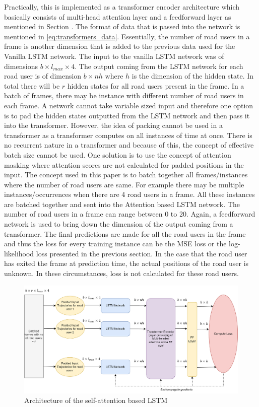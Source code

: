 \documentclass{article}
\begin{document}
Practically, this is implemented as a transformer encoder architecture which basically consists of multi-head attention layer and a feedforward layer as mentioned in Section .
The format of data that is passed into the network is mentioned in \ref{eq:transformers_data}. Essentially, the number of road users in a frame is another dimension that is added to the previous data used for the Vanilla LSTM network. The input to the vanilla LSTM network was of dimensions $b \times l_{max} \times 4$. The output coming from the LSTM network for each road user is of dimension $b \times nh$ where $h$ is the dimension of the hidden state. In total there will be $r$ hidden states for all road users present in the frame. In a batch of frames, there may be instance with different number of road users in each frame. A network cannot take variable sized input and therefore one option is to pad the hidden states outputted from the LSTM network and then pass it into the transformer. However, the idea of packing cannot be used in a transformer as a transformer computes on all instances of time at once. There is no recurrent nature in a transformer and because of this, the concept of effective batch size cannot be used. One solution is to use the concept of attention masking where attention scores are not calculated for padded positions in the input. The concept used in this paper is to batch together all frames/instances where the number of road users are same. For example there may be multiple instances/occurrences when there are 4 road users in a frame. All these instances are batched together and sent into the Attention based LSTM network. The number of road users in a frame can range between 0 to 20. Again, a feedforward network is used to bring down the dimension of the output coming from a transformer. The final predictions are made for all the road users in the frame and thus the loss for every training instance can be the MSE loss or the log-likelihood loss presented in the previous section. In the case that the road user has exited the frame at prediction time, the actual positions of the road user is unknown. In these  circumstances, loss is not calculated for these road users. 

\begin{figure}[H]
\centering
\includegraphics[scale=0.15]{method/tlstm.png}
\caption{Architecture of the self-attention based LSTM}
\end{figure}
\end{document}
